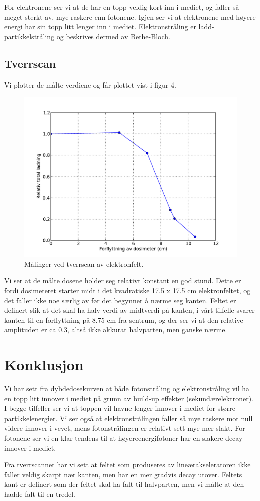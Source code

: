 \documentclass[a4paper, 11pt, notitlepage]{article}
\begin{document}
For elektronene ser vi at de har en topp veldig kort inn i mediet, og faller så meget sterkt av, mye raskere enn fotonene. Igjen ser vi at elektronene med høyere energi har sin topp litt lenger inn i mediet. Elektronstråling er ladd-partikkelstråling og beskrives dermed av Bethe-Bloch.

\subsection{Tverrscan}
Vi plotter de målte verdiene og får plottet vist i figur 4.
\begin{figure}[htpb]
\centering
\includegraphics[width=\textwidth]{tverrscan}
\caption{Målinger ved tverrscan av elektronfelt.}
\end{figure}

Vi ser at de målte dosene holder seg relativt konstant en god stund. Dette er fordi dosimeteret starter midt i det kvadratiske 17.5 x 17.5 cm elektronfeltet, og det faller ikke noe særlig av før det begynner å nærme seg kanten. Feltet er definert slik at det skal ha halv verdi av midtverdi på kanten, i vårt tilfelle svarer kanten til en forflyttning på 8.75 cm fra sentrum, og der ser vi at den relative amplituden er ca 0.3, altså ikke akkurat halvparten, men ganske nærme.

\section{Konklusjon}
Vi har sett fra dybdedosekurven at både fotonstråling og elektronstråling vil ha en topp litt innover i mediet på grunn av build-up effekter (sekundærelektroner). I begge tilfeller ser vi at toppen vil havne lenger innover i mediet for større partikkelenergier. Vi ser også at elektronstrålingen faller så mye raskere mot null videre innover i vevet, mens fotonstrålingen er relativt sett mye mer slakt. For fotonene ser vi en klar tendens til at høyereenergifotoner har en slakere decay innover i mediet.

Fra tverrscannet har vi sett at feltet som produseres av lineærakseleratoren ikke faller veldig skarpt nær kanten, men har en mer gradvis decay utover. Feltets kant er definert som der feltet skal ha falt til halvparten, men vi målte at den hadde falt til en tredel.
\end{document}
